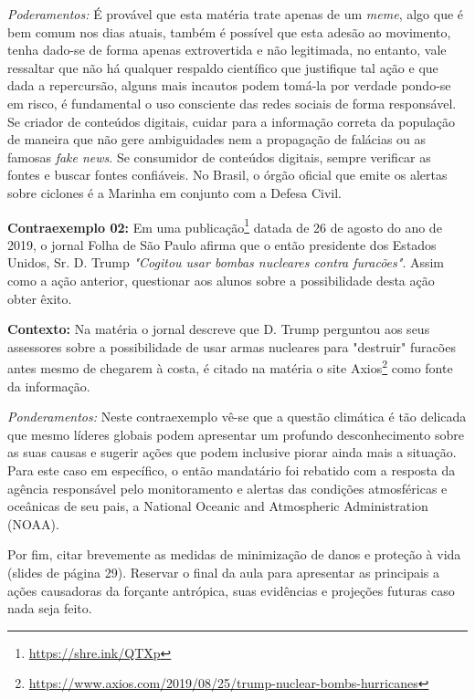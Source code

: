 \textit{Poderamentos:} É provável que esta matéria trate apenas de um \textit{meme}, algo que é bem comum nos dias atuais, também é possível que esta adesão ao movimento, tenha dado-se de forma apenas extrovertida e não legitimada, no entanto, vale ressaltar que não há qualquer respaldo científico que justifique tal ação e que dada a repercursão, alguns mais incautos podem tomá-la por verdade pondo-se em risco, é fundamental o uso consciente das redes sociais de forma responsável. Se criador de conteúdos digitais, cuidar para a informação correta da população de maneira que não gere ambiguidades nem a propagação de falácias ou as famosas \textit{fake news}. Se consumidor de conteúdos digitais, sempre verificar as fontes e buscar fontes confiáveis. No Brasil, o órgão oficial que emite os alertas sobre ciclones é a Marinha em conjunto com a Defesa Civil. 

\textbf{Contraexemplo 02:} Em uma publicação\footnote{\url{https://shre.ink/QTXp}} datada de 26 de agosto do ano de 2019, o jornal Folha de São Paulo afirma que o então presidente dos Estados Unidos, Sr. D. Trump \textit{"Cogitou usar bombas nucleares contra furacões"}. Assim como a ação anterior, questionar aos alunos sobre a possibilidade desta ação obter êxito.
\par\textbf{Contexto:} Na matéria o jornal descreve que D. Trump perguntou aos seus assessores sobre a possibilidade de usar armas nucleares para "destruir" furacões antes mesmo de chegarem à costa, é citado na matéria o site Axios\footnote{\url{https://www.axios.com/2019/08/25/trump-nuclear-bombs-hurricanes}} como fonte da informação.

\textit{Ponderamentos:} Neste contraexemplo vê-se que a questão climática é tão delicada que mesmo líderes globais podem apresentar um profundo desconhecimento sobre as suas causas e sugerir ações que podem inclusive piorar ainda mais a situação. Para este caso em específico, o então mandatário foi rebatido com a resposta da agência responsável pelo monitoramento e alertas das condições atmosféricas e oceânicas de seu pais, a National Oceanic and Atmospheric Administration (NOAA).

Por fim, citar brevemente as medidas de minimização de danos e proteção à vida (slides de página 29). Reservar o final da aula para apresentar as principais a ações causadoras da forçante antrópica, suas evidências e projeções futuras caso nada seja feito.

